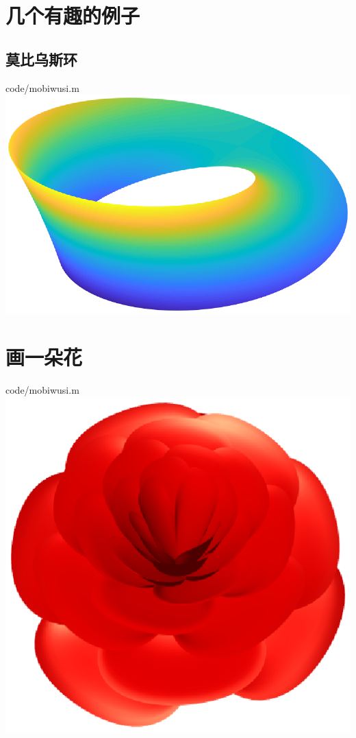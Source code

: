 \documentclass{hfutpaper}
\makeatletter
\newcommand{\figcaption}{\def\@captype{figure}\caption}
\makeatother
\begin{document}
\section{几个有趣的例子}
\subsection*{莫比乌斯环}

{code/mobiwusi.m}
\includegraphics[width=18cm]{figure/mobiwusi.eps}
\figcaption{莫比乌斯环}
\section*{画一朵花}

{code/mobiwusi.m}
\includegraphics[width=18cm]{figure/flower.eps}
\figcaption{花}
\end{document}
